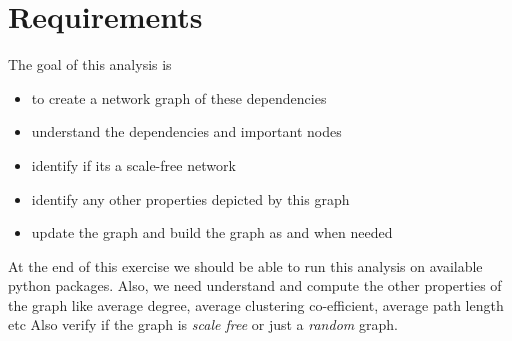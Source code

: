\section{Requirements} \label{req}
The goal of this analysis is
 \begin{itemize}
 \item to create a network graph of these dependencies
 \item understand the dependencies and important nodes
 \item identify if its a scale-free network
 \item identify any other properties depicted by this graph
 \item update the graph and build the graph as and when needed
 \end{itemize}
 At the end of this exercise we should be able to run this
 analysis on available python \cite{www-python-org} packages.
 Also, we need understand and compute the other properties of the graph
 like average degree, average clustering co-efficient, average path length etc
 Also verify if the graph is \textit{scale free} or just a \textit{random} graph.  

